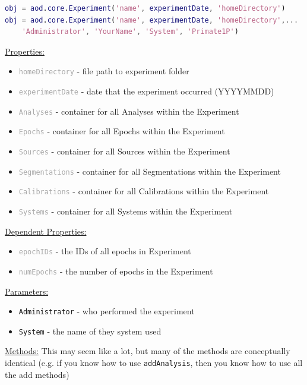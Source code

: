 \documentclass[10pt]{exam}
\newcommand\aodparam[1]{\textcolor{codepurple}{\texttt{#1}}}
\newcommand\aodprop[1]{\textcolor{darkgray}{\texttt{#1}}}
\newcommand\aodfcn[1]{\textcolor{darkteal}{\texttt{#1}}}
\newcommand\docheader[1]{\vspace{0.6ex}\noindent\underline{#1}\vspace{0.15ex}}
\begin{document}
		\begin{lstlisting}[language=matlab]
obj = aod.core.Experiment('name', experimentDate, 'homeDirectory')
obj = aod.core.Experiment('name', experimentDate, 'homeDirectory',...
	'Administrator', 'YourName', 'System', 'Primate1P')
		\end{lstlisting}		
		\docheader{Properties:}
		\begin{itemize}
			\item \aodprop{homeDirectory} - file path to experiment folder
			\item \aodprop{experimentDate} - date that the experiment occurred (YYYYMMDD)
			\item \aodprop{Analyses} - container for all Analyses within the Experiment
			\item \aodprop{Epochs} - container for all Epochs within the Experiment
			\item \aodprop{Sources} - container for all Sources within the Experiment
			\item \aodprop{Segmentations} - container for all Segmentations within the Experiment
			\item \aodprop{Calibrations} - container for all Calibrations within the Experiment
			\item \aodprop{Systems} - container for all Systems within the Experiment
		\end{itemize}		
		\docheader{Dependent Properties:}
		\begin{itemize}
			\item \aodprop{epochIDs} - the IDs of all epochs in Experiment
			\item \aodprop{numEpochs} - the number of epochs in the Experiment
		\end{itemize}
		\docheader{Parameters:}
		\begin{itemize}
			\item \aodparam{Administrator} - who performed the experiment
			\item \aodparam{System} - the name of they system used
		\end{itemize}
		\docheader{Methods:} This may seem like a lot, but many of the methods are conceptually identical (e.g. if you know how to use \aodfcn{addAnalysis}, then you know how to use all the add methods)
\end{document}
